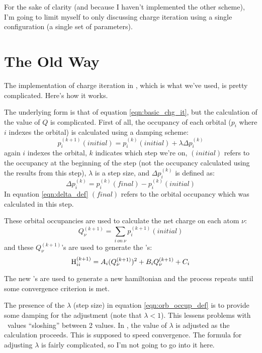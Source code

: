 For the sake of clarity (and because I haven't implemented the other
scheme), I'm going to limit myself to only discussing charge iteration
using a single configuration (a single set of parameters).

\section{The Old Way}

The implementation of charge iteration in , which is
what we've used, is pretty complicated.  Here's how it works.

The underlying form is that of equation \ref{eqn:basic_chg_it}, but
the calculation of 
the value of $Q$ is complicated.  First of all, the occupancy of each
orbital ($p_i$ where $i$ indexes the orbital) is calculated using a
damping scheme: 
\begin{equation}
p_i^{(k+1)}(initial) = p_i^{(k)}(initial) + \lambda \Delta p_i^{(k)}
\label{eqn:orb_occup_def}
\end{equation}
again $i$ indexes the orbital, $k$ indicates which step we're on,
$(initial)$ refers to the occupancy at the beginning of the step (not
the occupancy calculated using the results from this step), $\lambda$
is a step size, and $\Delta p_i^{(k)}$ is defined as:
\begin{equation}
\Delta p_i^{(k)} = p_i^{(k)}(final) - p_i^{(k)}(initial)
\label{eqn:delta_def}
\end{equation}
In equation \ref{eqn:delta_def} $(final)$ refers to the orbital
occupancy which was calculated in this step.

These orbital occupancies are used to calculate the net charge on each
atom $\nu$:
\begin{equation}
Q_{\nu}^{(k+1)} = \sum_{i\ on\ \nu} p_i^{(k+1)}(initial)
\label{eqn:old_net_chg_def}
\end{equation}
and these $Q_{\nu}^{(k+1)}$'s are used to generate the \Hiip's:
\begin{equation}
\mbox {H$_{ii}^{(k+1)}$} = A_i (Q_{\nu}^{(k+1)})^2 + B_i Q_{\nu}^{(k+1)} + C_i  
\label{eqn:Hiip_def}
\end{equation}

The new \Hiip's are used to generate a new hamiltonian and the process
repeats until some convergence criterion is met.

The presence of the $\lambda$ (step size) in equation
\ref{eqn:orb_occup_def} is to provide some damping for the adjustment
(note that $\lambda < 1$).  This lessens problems with \Hii\ values
``sloshing'' between 2 values. 
In , the value of $\lambda$ is adjusted as the
calculation proceeds.  This is supposed to speed convergence.  The
formula for adjusting $\lambda$ is fairly complicated, so I'm not
going to go into it here.

